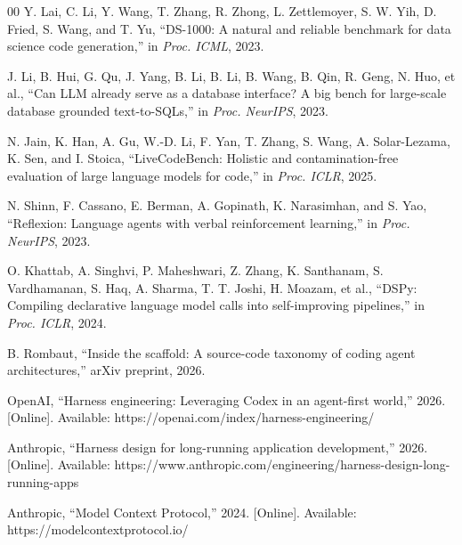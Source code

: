 \documentclass[conference]{IEEEtran}
\begin{document}
\begin{thebibliography}{00}
 Y. Lai, C. Li, Y. Wang, T. Zhang, R. Zhong, L. Zettlemoyer, S. W. Yih, D. Fried, S. Wang, and T. Yu, ``DS-1000: A natural and reliable benchmark for data science code generation,'' in \emph{Proc. ICML}, 2023.

 J. Li, B. Hui, G. Qu, J. Yang, B. Li, B. Li, B. Wang, B. Qin, R. Geng, N. Huo, et al., ``Can LLM already serve as a database interface? A big bench for large-scale database grounded text-to-SQLs,'' in \emph{Proc. NeurIPS}, 2023.

 N. Jain, K. Han, A. Gu, W.-D. Li, F. Yan, T. Zhang, S. Wang, A. Solar-Lezama, K. Sen, and I. Stoica, ``LiveCodeBench: Holistic and contamination-free evaluation of large language models for code,'' in \emph{Proc. ICLR}, 2025.

 N. Shinn, F. Cassano, E. Berman, A. Gopinath, K. Narasimhan, and S. Yao, ``Reflexion: Language agents with verbal reinforcement learning,'' in \emph{Proc. NeurIPS}, 2023.

 O. Khattab, A. Singhvi, P. Maheshwari, Z. Zhang, K. Santhanam, S. Vardhamanan, S. Haq, A. Sharma, T. T. Joshi, H. Moazam, et al., ``DSPy: Compiling declarative language model calls into self-improving pipelines,'' in \emph{Proc. ICLR}, 2024.

 B. Rombaut, ``Inside the scaffold: A source-code taxonomy of coding agent architectures,'' arXiv preprint, 2026.

 OpenAI, ``Harness engineering: Leveraging Codex in an agent-first world,'' 2026. [Online]. Available: https://openai.com/index/harness-engineering/

 Anthropic, ``Harness design for long-running application development,'' 2026. [Online]. Available: https://www.anthropic.com/engineering/harness-design-long-running-apps

 Anthropic, ``Model Context Protocol,'' 2024. [Online]. Available: https://modelcontextprotocol.io/

\end{thebibliography}
\end{document}

